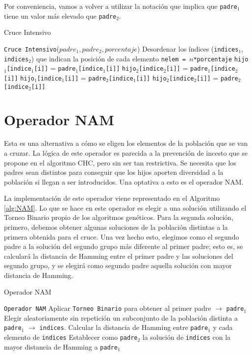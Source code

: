 Por conveniencia, vamos a volver a utilizar la notación que implica que \texttt{padre$_1$} tiene un valor más elevado que \texttt{padre$_2$}.

\begin{algorithm}
\caption{Cruce Intensivo}\label{alg:CI}
\begin{algorithmic}[1]
\Procedure \texttt{Cruce Intensivo}($padre_1, padre_2, porcentaje$)
\State Desordenar los índices (\texttt{indices$_1$}, \texttt{indices$_2$}) que indican la posición de cada elemento
\State \texttt{nelem = $n$*porcentaje}
		\State \texttt{hijo$_1$[indice$_1$[i]]} = \texttt{padre$_1$[indice$_1$[i]]}
		\State \texttt{hijo$_2$[indice$_2$[i]]} = \texttt{padre$_1$[indice$_2$[i]]}
	\Else
		\State \texttt{hijo$_1$[indice$_1$[i]]} = \texttt{padre$_2$[indice$_1$[i]]}
		\State \texttt{hijo$_2$[indice$_2$[i]]} = \texttt{padre$_2$[indice$_2$[i]]}
	\EndIf
\EndFor
\EndProcedure
\end{algorithmic}
\end{algorithm}

\section{Operador NAM}

Esta es una alternativa a cómo se eligen los elementos de la población que se van a cruzar. 
La lógica de este operador es parecida a la prevención de incesto que se propone en el algoritmo CHC, pero sin ser tan restrictiva. 
Se necesita que los padres sean distintos para conseguir que los hijos aporten diversidad a la población si llegan a ser introducidos. 
Una optativa a esto es el operador NAM. 

La implementación de este operador viene representado en el Algoritmo \ref{alg:NAM}. 
Lo que se hace en este operador es elegir a una solución utilizando el Torneo Binario propio de los algoritmos genéticos. 
Para la segunda solución, primero, debemos obtener algunas soluciones de la población distintas a la primera obtenida para el cruce. 
Una vez hecho esto, elegimos como el segundo padre a la solución del segundo grupo más diferente al primer padre; esto es, se calculará la distancia de Hamming entre el primer padre y las soluciones del segundo grupo, y se elegirá como segundo padre aquella solución con mayor distancia de Hamming.

\begin{algorithm}
\caption{Operador NAM}\label{alg:NAM}
\begin{algorithmic}[1]
\Procedure \texttt{Operador NAM}
\State Aplicar \texttt{Torneo Binario} para obtener al primer padre $\xrightarrow{}{}$ \texttt{padre$_1$}
\State Elegir aleatoriamente sin repetición un subconjunto de la población distinta a \texttt{padre$_1$} $\xrightarrow{}{}$ \texttt{indices}.
\State Calcular la distancia de Hamming entre \texttt{padre$_1$} y cada elemento de \texttt{indices}
\State Establecer como \texttt{padre$_2$} la solución de \texttt{indices} con la mayor distancia de Hamming a \texttt{padre$_1$}
\EndProcedure
\end{algorithmic}
\end{algorithm}

